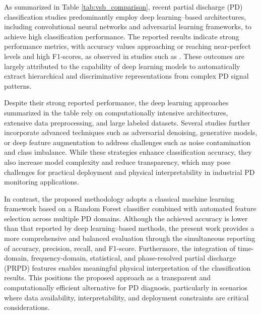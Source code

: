 As summarized in Table \ref{tab:vsb_comparison}, recent partial discharge (PD) classification studies predominantly employ deep learning–based architectures, including convolutional neural networks and adversarial learning frameworks, to achieve high classification performance. The reported results indicate strong performance metrics, with accuracy values approaching or reaching near-perfect levels and high F1-scores, as observed in studies such as \parencite{Almehdhar_2025, Ishaq_2025, Kalaivani_2025, Li_2025_30}. These outcomes are largely attributed to the capability of deep learning models to automatically extract hierarchical and discriminative representations from complex PD signal patterns.

Despite their strong reported performance, the deep learning approaches summarized in the table rely on computationally intensive architectures, extensive data preprocessing, and large labeled datasets. Several studies further incorporate advanced techniques such as adversarial denoising, generative models, or deep feature augmentation to address challenges such as noise contamination and class imbalance. While these strategies enhance classification accuracy, they also increase model complexity and reduce transparency, which may pose challenges for practical deployment and physical interpretability in industrial PD monitoring applications.

In contrast, the proposed methodology adopts a classical machine learning framework based on a Random Forest classifier combined with automated feature selection across multiple PD domains. Although the achieved accuracy is lower than that reported by deep learning–based methods, the present work provides a more comprehensive and balanced evaluation through the simultaneous reporting of accuracy, precision, recall, and F1-score. Furthermore, the integration of time-domain, frequency-domain, statistical, and phase-resolved partial discharge (PRPD) features enables meaningful physical interpretation of the classification results. This positions the proposed approach as a transparent and computationally efficient alternative for PD diagnosis, particularly in scenarios where data availability, interpretability, and deployment constraints are critical considerations.


